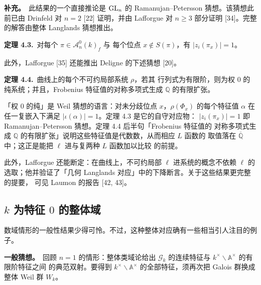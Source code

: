 \par\medskip\noindent\textbf{补充。}\ 此结果的一个直接推论是 $\mathrm{GL}_n$ 的
Ramanujan--Petersson 猜想。该猜想此前已由 Drinfeld 对 $n=2$ [22] 证明，并由
Lafforgue 对 $n\ge3$ 部分证明 [34]。完整的解答由整体 Langlands 猜想推出。

\par\medskip\noindent\textbf{定理 4.3.}\ 对每个 $\pi\in\mathcal{A}_n^0(k)_f$ 与
每个位点 $x\notin S(\pi)$，有 $|z_i(\pi_x)|=1$。
\par\medskip

此外，Lafforgue [35] 还能推出 Deligne 的下述猜想 [20]。

\par\medskip\noindent\textbf{定理 4.4.}\ 曲线上的每个不可约局部系统 $\rho$，若其
行列式为有限阶，则为权 $0$ 的纯系统；并且，Frobenius 特征值的对称多项式生成
$\mathbb{Q}$ 的有限扩张。
\par\medskip
\begin{annote}
「权 $0$ 的纯」是 Weil 猜想的语言：对未分歧位点 $x$，$\rho(\Phi_x)$ 的每个特征值
$\alpha$ 在任一复嵌入下满足 $|\iota(\alpha)|=1$。定理 4.3 是它的自守对应物：
$|z_i(\pi_x)|=1$ 即 Ramanujan--Petersson 猜想。定理 4.4 后半句「Frobenius 特征值的
对称多项式生成 $\mathbb{Q}$ 的有限扩张」说明这些特征值是代数数，从而相应 $L$ 函数的
取值落在 $\overline{\mathbb{Q}}$ 中；这正是能把 $\ell$ 进与复两种 $L$ 函数加以比较
的前提。
\par{}
\end{annote}

此外，Lafforgue 还能断定：在曲线上，不可约局部 $\ell$ 进系统的概念不依赖 $\ell$ 的
选取；他并验证了「几何 Langlands 对应」中的下降断言。关于这些结果更完整的提要，
可见 Laumon 的报告 [42, 43]。

\subsection{\texorpdfstring{$k$ 为特征 $0$ 的整体域}{k 为特征 0 的整体域}}

数域情形的一般性结果少得可怜。不过，这种整体对应确有一些相当引人注目的例子。

\par\medskip\noindent\textbf{一般猜想。}\ 回顾 $n=1$ 的情形：整体类域论给出
$\mathcal{G}_k$ 的连续特征与 $k^\times\backslash\mathbb{A}^\times$ 的有限阶特征之间
的典范双射。要得到 $k^\times\backslash\mathbb{A}^\times$ 的全部特征，须再次把
Galois 群换成整体 Weil 群 $W_k$。

